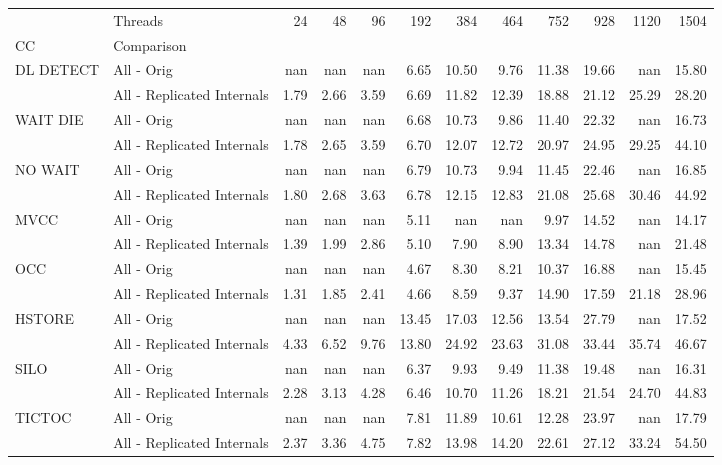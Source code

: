 \begin{tabular}{llrrrrrrrrrr}
\toprule
       & Threads &  24   &  48   &  96   &  192  &  384  &  464  &  752  &  928  &  1120 &  1504 \\
CC & Comparison &       &       &       &       &       &       &       &       &       &       \\
\midrule
DL DETECT & All - Orig &   nan &   nan &   nan &  6.65 & 10.50 &  9.76 & 11.38 & 19.66 &   nan & 15.80 \\
       & All - Replicated Internals &  1.79 &  2.66 &  3.59 &  6.69 & 11.82 & 12.39 & 18.88 & 21.12 & 25.29 & 28.20 \\
WAIT DIE & All - Orig &   nan &   nan &   nan &  6.68 & 10.73 &  9.86 & 11.40 & 22.32 &   nan & 16.73 \\
       & All - Replicated Internals &  1.78 &  2.65 &  3.59 &  6.70 & 12.07 & 12.72 & 20.97 & 24.95 & 29.25 & 44.10 \\
NO WAIT & All - Orig &   nan &   nan &   nan &  6.79 & 10.73 &  9.94 & 11.45 & 22.46 &   nan & 16.85 \\
       & All - Replicated Internals &  1.80 &  2.68 &  3.63 &  6.78 & 12.15 & 12.83 & 21.08 & 25.68 & 30.46 & 44.92 \\
MVCC & All - Orig &   nan &   nan &   nan &  5.11 &   nan &   nan &  9.97 & 14.52 &   nan & 14.17 \\
       & All - Replicated Internals &  1.39 &  1.99 &  2.86 &  5.10 &  7.90 &  8.90 & 13.34 & 14.78 &   nan & 21.48 \\
OCC & All - Orig &   nan &   nan &   nan &  4.67 &  8.30 &  8.21 & 10.37 & 16.88 &   nan & 15.45 \\
       & All - Replicated Internals &  1.31 &  1.85 &  2.41 &  4.66 &  8.59 &  9.37 & 14.90 & 17.59 & 21.18 & 28.96 \\
HSTORE & All - Orig &   nan &   nan &   nan & 13.45 & 17.03 & 12.56 & 13.54 & 27.79 &   nan & 17.52 \\
       & All - Replicated Internals &  4.33 &  6.52 &  9.76 & 13.80 & 24.92 & 23.63 & 31.08 & 33.44 & 35.74 & 46.67 \\
SILO & All - Orig &   nan &   nan &   nan &  6.37 &  9.93 &  9.49 & 11.38 & 19.48 &   nan & 16.31 \\
       & All - Replicated Internals &  2.28 &  3.13 &  4.28 &  6.46 & 10.70 & 11.26 & 18.21 & 21.54 & 24.70 & 44.83 \\
TICTOC & All - Orig &   nan &   nan &   nan &  7.81 & 11.89 & 10.61 & 12.28 & 23.97 &   nan & 17.79 \\
       & All - Replicated Internals &  2.37 &  3.36 &  4.75 &  7.82 & 13.98 & 14.20 & 22.61 & 27.12 & 33.24 & 54.50 \\
\bottomrule
\end{tabular}
